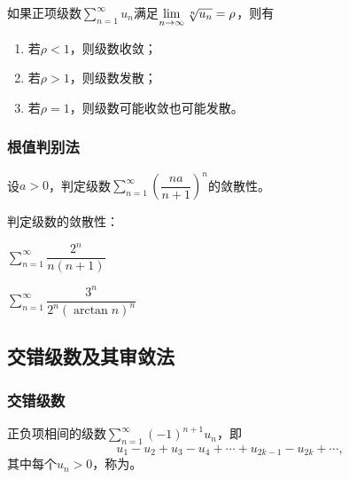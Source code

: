 \documentclass[14pt,notheorems,leqno,xcolor={rgb}]{beamer} %
\begin{document}

\begin{frame}
\begin{theorem}[根值判别法]
如果正项级数$\sum\limits_{n=1}^{\infty}u_n$满足$\lim\limits_{n\to\infty}\sqrt[n]{u_n}=\rho$，则有
\begin{enumerate}[<+->]
  \item 若$\rho<1$，则级数收敛；
  \item 若$\rho>1$，则级数发散；
  \item 若$\rho=1$，则级数可能收敛也可能发散。
\end{enumerate}
\end{theorem}
\end{frame}

\begin{frame}
\frametitle{根值判别法}
\begin{example}
设$a>0$，判定级数$\sum\limits_{n=1}^{\infty}\left(\dfrac{na}{n+1}\right)^n$的敛散性。
\end{example}
\end{frame}

\begin{frame}
\begin{exercise}
判定级数的敛散性：
\begin{enumlite}
  \item $\sum\limits_{n=1}^{\infty}\dfrac{2^n}{n(n+1)}$
  \item $\sum\limits_{n=1}^{\infty}\dfrac{3^n}{2^n(\arctan n)^n}$
\end{enumlite}
\end{exercise}
\end{frame}

\subsection{交错级数及其审敛法}

\begin{frame}
\frametitle{交错级数}
\begin{definition}
正负项相间的级数$\sum\limits_{n=1}^{\infty}(-1)^{n+1}u_n$，即
$$u_1-u_2+u_3-u_4+\cdots+u_{2k-1}-u_{2k}+\cdots,$$
其中每个$u_n>0$，称为。
\end{definition}
\end{frame}
\end{document}
